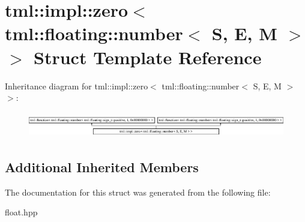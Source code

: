 \hypertarget{structtml_1_1impl_1_1zero_3_01tml_1_1floating_1_1number_3_01S_00_01E_00_01M_01_4_01_4}{\section{tml\+:\+:impl\+:\+:zero$<$ tml\+:\+:floating\+:\+:number$<$ S, E, M $>$ $>$ Struct Template Reference}
\label{structtml_1_1impl_1_1zero_3_01tml_1_1floating_1_1number_3_01S_00_01E_00_01M_01_4_01_4}
}
Inheritance diagram for tml\+:\+:impl\+:\+:zero$<$ tml\+:\+:floating\+:\+:number$<$ S, E, M $>$ $>$\+:\begin{figure}[H]
\begin{center}
\leavevmode
\includegraphics[height=1.147541cm]{structtml_1_1impl_1_1zero_3_01tml_1_1floating_1_1number_3_01S_00_01E_00_01M_01_4_01_4}
\end{center}
\end{figure}
\subsection*{Additional Inherited Members}


The documentation for this struct was generated from the following file\+:\begin{DoxyCompactItemize}
\item 
float.\+hpp\end{DoxyCompactItemize}
